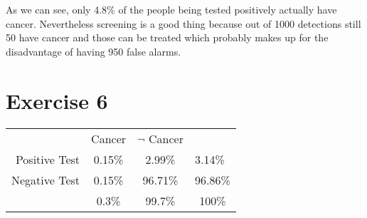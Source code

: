 \documentclass{article}
\begin{document}
As we can see, only 4.8\% of the people being tested positively actually have cancer. Nevertheless screening is a good thing because out of 1000 detections still 50 have cancer and those can be treated which probably makes up for the disadvantage of having 950 false alarms.  

\setcounter{equation}{0}
\section*{Exercise 6}

\begin{tabular}{ r|c|c|l }
\multicolumn{1}{r}{}
 &  \multicolumn{1}{c}{Cancer}
 & \multicolumn{1}{c}{$\neg$ Cancer} \\
\cline{2-3}
Positive Test & 0.15\% & 2.99\% & 3.14\%\\ 
\cline{2-3}
Negative Test & 0.15\% & 96.71\% & 96.86\% \\
\cline{2-3}
\multicolumn{1}{r}{}
 &  \multicolumn{1}{c}{0.3\%}
 & \multicolumn{1}{c}{99.7\%}  & \multicolumn{1}{c}{100\%}\\
\end{tabular}
\end{document}
